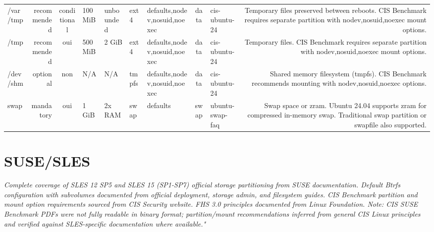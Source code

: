 \documentclass[10pt,a4paper]{article}
\begin{document}
{\begin{longtable}{M R S Z Z T O C I N}
/var/tmp & \textcolor{cHigh}{recommended} & conditional & 100 MiB & unbounded & ext4 & defaults,nodev,nosuid,noexec & data & cis-ubuntu-24 & Temporary files preserved between reboots. CIS Benchmark requires separate partition with nodev,nosuid,noexec mount options.\\
/tmp & \textcolor{cHigh}{recommended} & \textcolor{cOk}{oui} & 500 MiB & 2 GiB & ext4 & defaults,nodev,nosuid,noexec & data & cis-ubuntu-24 & Temporary files. CIS Benchmark requires separate partition with nodev,nosuid,noexec mount options.\\
/dev/shm & \textcolor{cLow}{optional} & non & N/A & N/A & tmpfs & defaults,nodev,nosuid,noexec & data & cis-ubuntu-24 & Shared memory filesystem (tmpfs). CIS Benchmark recommends mounting with nodev,nosuid,noexec options.\\
swap & \textcolor{cBlock}{mandatory} & \textcolor{cOk}{oui} & 1 GiB & 2x RAM & swap & defaults & swap & ubuntu-swap-faq & Swap space or zram. Ubuntu 24.04 supports zram for compressed in-memory swap. Traditional swap partition or swapfile also supported.\\
\bottomrule\end{longtable}}
\clearpage
\section{SUSE/SLES}
\noindent\small\textit{Complete coverage of SLES 12 SP5 and SLES 15 (SP1-SP7) official storage partitioning from SUSE documentation. Default Btrfs configuration with subvolumes documented from official deployment, storage admin, and filesystem guides. CIS Benchmark partition and mount option requirements sourced from CIS Security website. FHS 3.0 principles documented from Linux Foundation. Note: CIS SUSE Benchmark PDFs were not fully readable in binary format; partition/mount recommendations inferred from general CIS Linux principles and verified against SLES-specific documentation where available."}\normalsize\par\medskip
\end{document}
